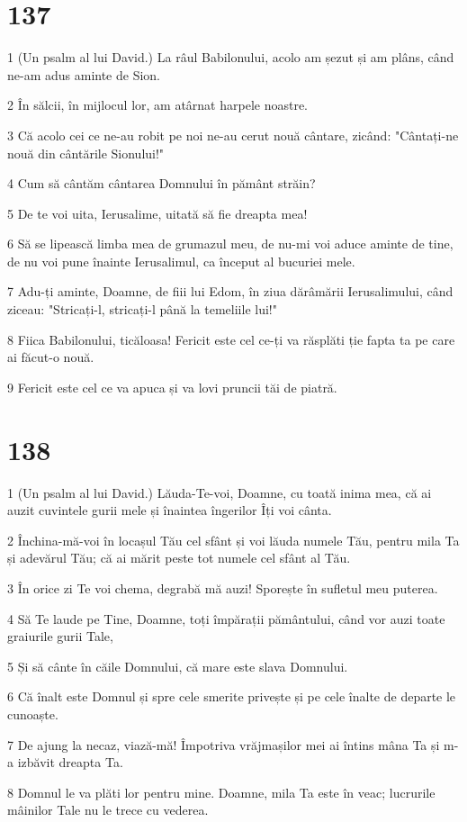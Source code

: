 \chapter{137}

\par 1 (Un psalm al lui David.) La râul Babilonului, acolo am șezut și am plâns, când ne-am adus aminte de Sion.
\par 2 În sălcii, în mijlocul lor, am atârnat harpele noastre.
\par 3 Că acolo cei ce ne-au robit pe noi ne-au cerut nouă cântare, zicând: "Cântați-ne nouă din cântările Sionului!"
\par 4 Cum să cântăm cântarea Domnului în pământ străin?
\par 5 De te voi uita, Ierusalime, uitată să fie dreapta mea!
\par 6 Să se lipească limba mea de grumazul meu, de nu-mi voi aduce aminte de tine, de nu voi pune înainte Ierusalimul, ca început al bucuriei mele.
\par 7 Adu-ți aminte, Doamne, de fiii lui Edom, în ziua dărâmării Ierusalimului, când ziceau: "Stricați-l, stricați-l până la temeliile lui!"
\par 8 Fiica Babilonului, ticăloasa! Fericit este cel ce-ți va răsplăti ție fapta ta pe care ai făcut-o nouă.
\par 9 Fericit este cel ce va apuca și va lovi pruncii tăi de piatră.

\chapter{138}

\par 1 (Un psalm al lui David.) Lăuda-Te-voi, Doamne, cu toată inima mea, că ai auzit cuvintele gurii mele și înaintea îngerilor Îți voi cânta.
\par 2 Închina-mă-voi în locașul Tău cel sfânt și voi lăuda numele Tău, pentru mila Ta și adevărul Tău; că ai mărit peste tot numele cel sfânt al Tău.
\par 3 În orice zi Te voi chema, degrabă mă auzi! Sporește în sufletul meu puterea.
\par 4 Să Te laude pe Tine, Doamne, toți împărații pământului, când vor auzi toate graiurile gurii Tale,
\par 5 Și să cânte în căile Domnului, că mare este slava Domnului.
\par 6 Că înalt este Domnul și spre cele smerite privește și pe cele înalte de departe le cunoaște.
\par 7 De ajung la necaz, viază-mă! Împotriva vrăjmașilor mei ai întins mâna Ta și m-a izbăvit dreapta Ta.
\par 8 Domnul le va plăti lor pentru mine. Doamne, mila Ta este în veac; lucrurile mâinilor Tale nu le trece cu vederea.

